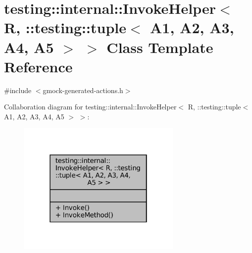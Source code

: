 \hypertarget{classtesting_1_1internal_1_1InvokeHelper_3_01R_00_01_1_1testing_1_1tuple_3_01A1_00_01A2_00_01A3_00_01A4_00_01A5_01_4_01_4}{}\section{testing\+:\+:internal\+:\+:Invoke\+Helper$<$ R, \+:\+:testing\+:\+:tuple$<$ A1, A2, A3, A4, A5 $>$ $>$ Class Template Reference}
\label{classtesting_1_1internal_1_1InvokeHelper_3_01R_00_01_1_1testing_1_1tuple_3_01A1_00_01A2_00_01A3_00_01A4_00_01A5_01_4_01_4}


{\ttfamily \#include $<$gmock-\/generated-\/actions.\+h$>$}



Collaboration diagram for testing\+:\+:internal\+:\+:Invoke\+Helper$<$ R, \+:\+:testing\+:\+:tuple$<$ A1, A2, A3, A4, A5 $>$ $>$\+:
\nopagebreak
\begin{figure}[H]
\begin{center}
\leavevmode
\includegraphics[width=226pt]{classtesting_1_1internal_1_1InvokeHelper_3_01R_00_01_1_1testing_1_1tuple_3_01A1_00_01A2_00_01A3_0f00c60bd8817b3ca5025c292226c0dc}
\end{center}
\end{figure}
